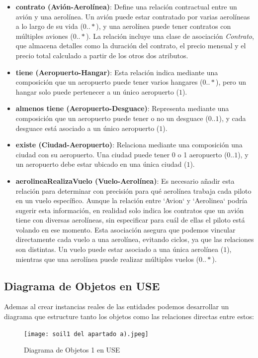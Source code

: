 \documentclass[12pt.a4paper]{article}
\begin{document}
\begin{itemize}
\item \textbf{contrato (Avión-Aerolínea)}: Define una relación contractual entre un avión y una aerolínea. Un avión puede estar contratado por varias aerolíneas a lo largo de su vida (\(0..*\)), y una aerolínea puede tener contratos con múltiples aviones (\(0..*\)). La relación incluye una clase de asociación \textit{Contrato}, que almacena detalles como la duración del contrato, el precio mensual y el precio total calculado a partir de los otros dos atributos.

\item \textbf{tiene (Aeropuerto-Hangar)}: Esta relación indica mediante una composición que un aeropuerto puede tener varios hangares (\(0..*\)), pero un hangar solo puede pertenecer a un único aeropuerto (\(1\)).

\item \textbf{almenos tiene (Aeropuerto-Desguace)}: Representa mediante una composición que un aeropuerto puede tener o no un desguace (\(0..1\)), y cada desguace está asociado a un único aeropuerto (\(1\)).

\item \textbf{existe (Ciudad-Aeropuerto)}: Relaciona mediante una composición una ciudad con su aeropuerto. Una ciudad puede tener 0 o 1 aeropuerto (\(0..1\)), y un aeropuerto debe estar ubicado en una única ciudad (\(1\)).

\item \textbf{aerolineaRealizaVuelo (Vuelo-Aerolínea)}: 
Es necesario añadir esta relación para determinar con precisión para qué aerolínea trabaja cada piloto en un vuelo específico. Aunque la relación entre `Avion` y `Aerolinea` podría sugerir esta información, en realidad solo indica los contratos que un avión tiene con diversas aerolíneas, sin especificar para cuál de ellas el piloto está volando en ese momento. Esta asociación asegura que podemos vincular directamente cada vuelo a una aerolínea, evitando ciclos, ya que las relaciones son distintas. Un vuelo puede estar asociado a una única aerolínea (\(1\)), mientras que una aerolínea puede realizar múltiples vuelos (\(0..*\)).
\end{itemize}

\vspace{1.0cm}

\subsection{Diagrama de Objetos en USE}
Ademas al crear instancias reales de las entidades podemos desarrollar un diagrama que estructure tanto los objetos como las relaciones directas entre estos:
\vspace{1.0cm}
\begin{figure}[H]
     \texttt{[image: soil1 del apartado a).jpeg]}
     \caption{Diagrama de Objetos 1 en USE}
     \label{Diagrama de Objetos 1 en USE}
\end{figure}
\end{document}
